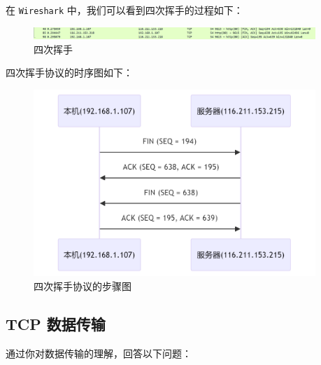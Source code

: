 \documentclass{article}
\begin{document}
在 \texttt{Wireshark} 中，我们可以看到四次挥手的过程如下：

\begin{figure}[H]
  \centering
  \includegraphics[width=0.95\textwidth]{img/8.png}
  \caption{四次挥手}
\end{figure}

四次挥手协议的时序图如下：

\begin{figure}[H]
  \centering
  \includegraphics[width=0.95\textwidth]{img/9.png}
  \caption{四次挥手协议的步骤图}
\end{figure}

\subsection{TCP 数据传输}

通过你对数据传输的理解，回答以下问题：
\end{document}
